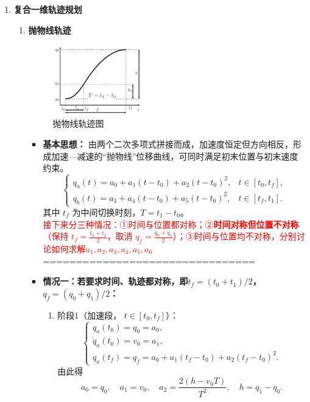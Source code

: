 \documentclass[../main.tex]{subfiles}
\begin{document}
\begin{enumerate}
    \item \textbf{复合一维轨迹规划}\label{sec:composite-1d}
        \begin{enumerate}
            \item \textbf{抛物线轨迹}\label{method:parabola}
                    \begin{figure}[H]
                        \centering
                        \includegraphics[width=0.4\textwidth]{images/pwx0.png}
                        \caption{抛物线轨迹图}
                    \end{figure}    
            {\small\kaishu
            \begin{itemize}
                \item \textbf{基本思想：}  
                由两个二次多项式拼接而成，加速度恒定但方向相反，形成加速—减速的“抛物线”位移曲线，可同时满足初末位置与初末速度约束。
                \[
                \begin{cases}
                q_a(t) = a_0 + a_1(t-t_0) + a_2(t-t_0)^2, & t\in[t_0,t_f],\\[4pt]
                q_b(t) = a_3 + a_4(t-t_0) + a_5(t-t_0)^2, & t\in[t_f,t_1].
                \end{cases}
                \]
                其中 $t_f$ 为中间切换时刻，$T=t_1-t_0$。\\
                \textcolor{red}{接下来分三种情况：\;①时间与位置都对称；②\textbf{时间对称但位置不对称}（保持 $t_f=\tfrac{t_0+t_1}{2}$，取消 $q_f=\tfrac{q_0+q_1}{2}$）；③时间与位置均不对称，分别讨论如何求解$a_1,a_2,a_3,a_4,a_5,a_6$}\\================================   
                \item \textbf{情况一：若要求时间、轨迹都对称，即$t_f=(t_0+t_1)/2$，$q_f=(q_0+q_1)/2$：}
                \begin{enumerate}
                    \item 阶段1（加速段， $t\in[t_0,t_f]$）：
                    \[
                    \begin{cases}
                    q_a(t_0)=q_0=a_0,\\
                    \dot q_a(t_0)=v_0=a_1,\\
                    q_a(t_f)=q_f=a_0+a_1(t_f-t_0)+a_2(t_f-t_0)^2.
                    \end{cases}
                    \]
                    由此得
                    \[
                    a_0=q_0,\quad a_1=v_0,\quad a_2=\frac{2(h-v_0T)}{T^2},\quad h=q_1-q_0.
                    \]
        

\end{enumerate}
\end{itemize}}
\end{enumerate}
\end{enumerate}
\end{document}
